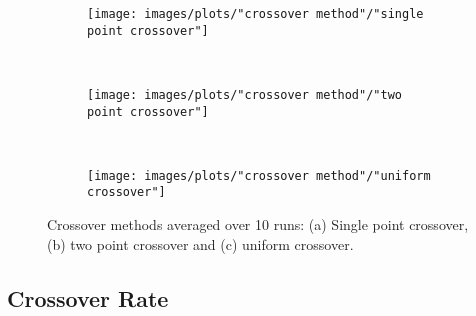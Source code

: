 \documentclass[12pt]{report}
\begin{document}
\begin{figure}[h!]
    \centering
    \begin{subfigure}[b]{0.31\textwidth}
        \texttt{[image: images/plots/"crossover method"/"single point crossover"]}
        \caption{}
        \hfill
        \label{plot:single point crossover}
    \end{subfigure}
    ~
    \begin{subfigure}[b]{0.31\textwidth}
        \texttt{[image: images/plots/"crossover method"/"two point crossover"]}
        \caption{}
        \hfill
        \label{plot:two point crossover}
    \end{subfigure}
    ~
    \begin{subfigure}[b]{0.31\textwidth}
        \texttt{[image: images/plots/"crossover method"/"uniform crossover"]}
        \caption{}
        \hfill
        \label{plot:uniform crossover}
    \end{subfigure}
    \caption{Crossover methods averaged over 10 runs: (a) Single point crossover, (b) two point crossover and (c) uniform crossover.}
    \label{plot:crossover methods}
\end{figure}


\subsection{Crossover Rate}
\end{document}
